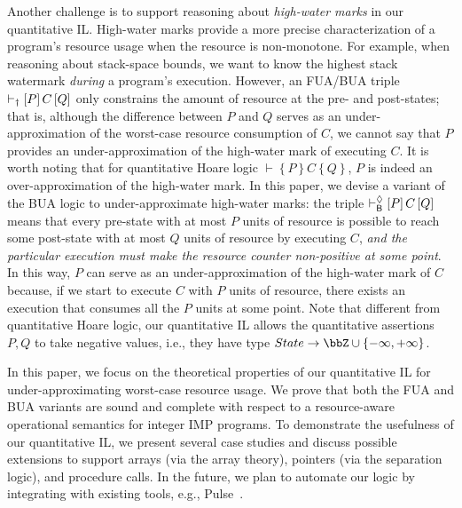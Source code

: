 Another challenge is to support reasoning about \emph{high-water marks} in our quantitative IL.
%
High-water marks provide a more precise characterization of a program's resource usage when the resource is non-monotone.
%
For example, when reasoning about stack-space bounds, we want to know the highest stack watermark \emph{during} a program's execution.
%
However, an FUA/BUA triple $\vdash_{\text{\textdagger}}\left[P\right]C\left[Q\right]$ only constrains the amount of resource at the pre- and post-states;
that is, although the difference between $P$ and $Q$ serves as an under-approximation of the worst-case resource consumption of $C$, we cannot say that $P$ provides an under-approximation of the high-water mark of executing $C$.
%
It is worth noting that for quantitative Hoare logic $\vdash \left\{P\right\} C \left\{Q\right\}$, $P$ is indeed an over-approximation of the high-water mark.
%
In this paper, we devise a variant of the BUA logic to under-approximate high-water marks:
the triple $\vdash^{\Diamond}_{\mathsf{B}}\left[P\right]C\left[Q\right]$ means that every pre-state with at most $P$ units of resource is possible to reach some post-state with at most $Q$ units of resource by executing $C$, \emph{and the particular execution must make the resource counter non-positive at some point}.
%
In this way, $P$ can serve as an under-approximation of the high-water mark of $C$ because, if we start to execute $C$ with $P$ units of resource, there exists an execution that consumes all the $P$ units at some point.
%
Note that different from quantitative Hoare logic, our quantitative IL allows the quantitative assertions $P,Q$ to take negative values, i.e., they have type $State \to \bbZ \cup \{{-}\infty,{+}\infty\}$.

In this paper, we focus on the theoretical properties of our quantitative IL for under-approximating worst-case resource usage.
%
We prove that both the FUA and BUA variants are sound and complete with respect to a resource-aware operational semantics for integer IMP programs.
%
To demonstrate the usefulness of our quantitative IL, we present several case studies and discuss possible extensions to support arrays (via the array theory), pointers (via the separation logic), and procedure calls.
%
In the future, we plan to automate our logic by integrating with existing tools, e.g., Pulse~\cite{OOPSLA:LRV22}.

